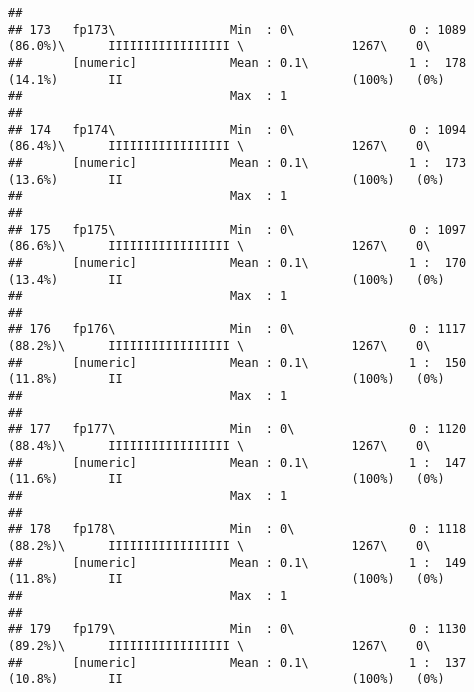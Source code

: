 \documentclass[]{article}
\begin{document}
\begin{verbatim}
## 
## 173   fp173\                Min  : 0\                0 : 1089 (86.0%)\      IIIIIIIIIIIIIIIII \               1267\    0\       
##       [numeric]             Mean : 0.1\              1 :  178 (14.1%)       II                                (100%)   (0%)     
##                             Max  : 1                                                                                            
## 
## 174   fp174\                Min  : 0\                0 : 1094 (86.4%)\      IIIIIIIIIIIIIIIII \               1267\    0\       
##       [numeric]             Mean : 0.1\              1 :  173 (13.6%)       II                                (100%)   (0%)     
##                             Max  : 1                                                                                            
## 
## 175   fp175\                Min  : 0\                0 : 1097 (86.6%)\      IIIIIIIIIIIIIIIII \               1267\    0\       
##       [numeric]             Mean : 0.1\              1 :  170 (13.4%)       II                                (100%)   (0%)     
##                             Max  : 1                                                                                            
## 
## 176   fp176\                Min  : 0\                0 : 1117 (88.2%)\      IIIIIIIIIIIIIIIII \               1267\    0\       
##       [numeric]             Mean : 0.1\              1 :  150 (11.8%)       II                                (100%)   (0%)     
##                             Max  : 1                                                                                            
## 
## 177   fp177\                Min  : 0\                0 : 1120 (88.4%)\      IIIIIIIIIIIIIIIII \               1267\    0\       
##       [numeric]             Mean : 0.1\              1 :  147 (11.6%)       II                                (100%)   (0%)     
##                             Max  : 1                                                                                            
## 
## 178   fp178\                Min  : 0\                0 : 1118 (88.2%)\      IIIIIIIIIIIIIIIII \               1267\    0\       
##       [numeric]             Mean : 0.1\              1 :  149 (11.8%)       II                                (100%)   (0%)     
##                             Max  : 1                                                                                            
## 
## 179   fp179\                Min  : 0\                0 : 1130 (89.2%)\      IIIIIIIIIIIIIIIII \               1267\    0\       
##       [numeric]             Mean : 0.1\              1 :  137 (10.8%)       II                                (100%)   (0%)     

\end{verbatim}
\end{document}
